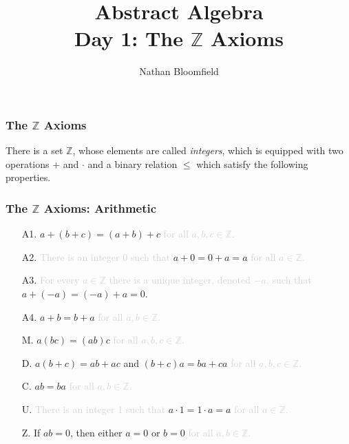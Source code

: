 \documentclass{beamer}
\begin{document}
\title{Abstract Algebra \\ Day 1: The $\mathbb{Z}$ Axioms}
\author{Nathan Bloomfield}

\begin{frame}
\titlepage
\end{frame}



\begin{frame}
\frametitle{The $\mathbb{Z}$ Axioms}
There is a set $\mathbb{Z}$, whose elements are called \emph{integers}, which is equipped with two operations $+$ and $\cdot$ and a binary relation $\leq$ which satisfy the following properties.
\end{frame}



\begin{frame}
\frametitle{The $\mathbb{Z}$ Axioms: Arithmetic}
\begin{itemize}
\item[A1.] $a+(b+c) = (a+b)+c$ \textcolor{lightgray}{for all $a,b,c \in \mathbb{Z}$.} \pause
\item[A2.] \textcolor{lightgray}{There is an integer 0 such that} $a + 0 = 0 + a = a$ \textcolor{lightgray}{for all $a \in \mathbb{Z}$.} \pause
\item[A3.] \textcolor{lightgray}{For every $a \in \mathbb{Z}$ there is a unique integer, denoted $-a$, such that} $a + (-a) = (-a) + a = 0$. \pause
\item[A4.] $a + b = b + a$ \textcolor{lightgray}{for all $a,b \in \mathbb{Z}$.} \pause
\item[M.] $a(bc) = (ab)c$ \textcolor{lightgray}{for all $a,b,c \in \mathbb{Z}$.} \pause
\item[D.] $a(b+c) = ab + ac$ and $(b+c)a = ba + ca$ \textcolor{lightgray}{for all $a,b,c \in \mathbb{Z}$.} \pause
\item[C.] $ab = ba$ \textcolor{lightgray}{for all $a,b \in \mathbb{Z}$.} \pause
\item[U.] \textcolor{lightgray}{There is an integer 1 such that} $a \cdot 1 = 1 \cdot a = a$ \textcolor{lightgray}{for all $a \in \mathbb{Z}$.} \pause
\item[Z.] If $ab = 0$, then either $a = 0$ or $b = 0$ \textcolor{lightgray}{for all $a,b \in \mathbb{Z}$.}
\end{itemize}
\end{frame}
\end{document}
